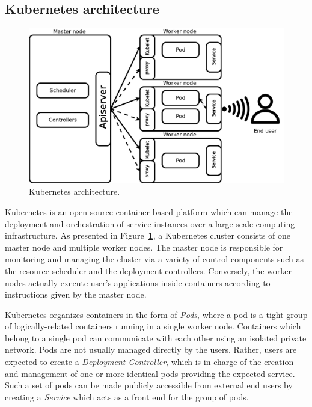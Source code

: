 \documentclass[letterpaper,twocolumn,10pt]{article}
\newcommand{\note}[1]{\noindent{\color{red}\textbf{#1}}}
\newcommand{\notegp}[1]{\note{\color{jazzberryjam}[\textsc{Guillaume:} #1]}}
\newcommand{\noteaf}[1]{\note{\color{ultramarine}[\textsc{Ali:} #1]}}
\let\origref\ref
\def\ref#1{\textbf{\origref{#1}}}
\begin{document}
\subsection{Kubernetes architecture}

\begin{figure}[t]
  \centering
  \includegraphics[width=\linewidth]{images/arch.png}
  \caption{Kubernetes architecture.} 
  \label{fig:arch}
\end{figure}

Kubernetes is an open-source container-based platform which can manage
the deployment and orchestration of service instances over a
large-scale computing infrastructure. As presented in
Figure~\ref{fig:arch}, a Kubernetes cluster consists of one master node
and multiple worker nodes. The master node is responsible for
monitoring and managing the cluster via a variety of control
components such as the resource scheduler and the deployment
controllers. Conversely, the worker nodes actually execute user's
applications inside containers according to instructions given by the
master node.

Kubernetes organizes containers in the form of \emph{Pods}, where a
pod is a tight group of logically-related containers running in a
single worker node. Containers which belong to a single pod can
communicate with each other using an isolated private network. Pods
are not usually managed directly by the users. Rather, users are
expected to create a \emph{Deployment Controller}, which is in charge
of the creation and management of one or more identical pods providing
the expected service. Such a set of pods can be made publicly
accessible from external end users by creating a \emph{Service} which
acts as a front end for the group of pods.
\end{document}

